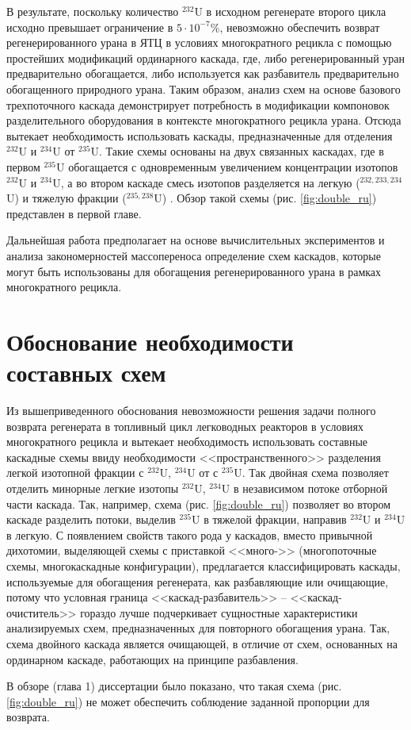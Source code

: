 В результате, поскольку количество $^{232}$U в исходном регенерате второго цикла исходно превышает ограничение в $5\cdot10^{-7}$\%, невозможно обеспечить возврат регенерированного урана в ЯТЦ в условиях многократного рецикла с помощью простейших модификаций ординарного каскада, где, либо регенерированный уран предварительно обогащается, либо используется как разбавитель предварительно обогащенного природного урана.
Таким образом, анализ схем на основе базового трехпоточного каскада демонстрирует потребность в модификации компоновок разделительного оборудования в контексте многократного рецикла урана.
Отсюда вытекает необходимость использовать каскады, предназначенные для отделения $^{232}$U и $^{234}$U от $^{235}$U. Такие схемы основаны на двух связанных каскадах, где в первом $^{235}$U обогащается с одновременным увеличением концентрации изотопов $^{232}$U и $^{234}$U, а во втором каскаде смесь изотопов разделяется на легкую ($^{232,233,234}$U) и тяжелую фракции ($^{235,238}$U) \cite{smirnovApplyingEnrichmentCapacities2018}.
Обзор такой схемы (рис. \ref{fig:double_ru}) представлен в первой главе.

Дальнейшая работа предполагает на основе вычислительных экспериментов и анализа закономерностей массопереноса определение схем каскадов, которые могут быть использованы для обогащения регенерированного урана в рамках многократного рецикла.

\section{Обоснование необходимости составных схем}\label{sec:ch2/sec2}
Из вышеприведенного обоснования невозможности решения задачи полного возврата регенерата в топливный цикл легководных реакторов в условиях многократного рецикла и вытекает необходимость использовать составные каскадные схемы ввиду необходимости  <<пространственного>> разделения легкой изотопной фракции с $^{232}$U, $^{234}$U от с $^{235}$U. Так двойная схема позволяет отделить минорные легкие изотопы $^{232}$U, $^{234}$U в независимом потоке отборной части каскада.
Так, например, схема (рис. \ref{fig:double_ru}) позволяет во втором каскаде разделить потоки, выделив $^{235}$U в тяжелой фракции, направив $^{232}$U и $^{234}$U в легкую.
С появлением свойств такого рода у каскадов, вместо привычной дихотомии, выделяющей схемы с приставкой <<много->> (многопоточные схемы, многокаскадные конфигурации), предлагается классифицировать каскады, используемые для обогащения регенерата, как разбавляющие или очищающие, потому что условная граница <<каскад-разбавитель>> -- <<каскад-очиститель>> гораздо лучше подчеркивает сущностные характеристики анализируемых схем, предназначенных для повторного обогащения урана. Так, схема двойного каскада является очищающей, в отличие от схем, основанных на ординарном каскаде, работающих на принципе разбавления.  

В обзоре (глава 1) диссертации было показано, что такая схема (рис. \ref{fig:double_ru}) не может обеспечить соблюдение заданной пропорции для возврата.
